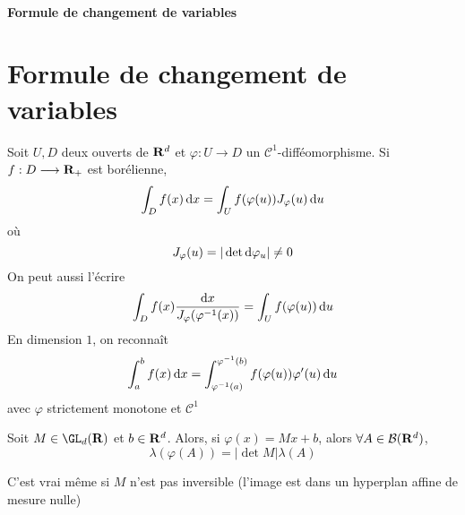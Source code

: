 \ifsolo
    ~

    \vspace{1cm}

    \begin{center}
        \textbf{\LARGE Formule de changement de variables} \\[1em]
    \end{center}
    \tableofcontents
\else
    \chapter{Formule de changement de variables}

    \minitoc
\fi
\thispagestyle{empty}

\begin{thm}
Soit $U, D$ deux ouverts de  $\mathbf R^d$ et $\varphi : U \longrightarrow D$ un $\mathcal  C^1$-difféomorphisme. Si $f : D \longrightarrow  \mathbf R_+$ est borélienne, \[
    \int_D f(x)\mathop{}\!\mathrm d x = \int_U f(\varphi(u))J_{\varphi}(u)\mathop{}\!\mathrm d u
\] 
où \[
    J_\varphi(u)=|\det \mathop{}\!\mathrm d \varphi_u|\neq 0
\] 
On peut aussi l'écrire \[
    \int_Df(x)\frac{\mathop{}\!\mathrm d x}{J_\varphi(\varphi^{-1}(x))}=\int_U f(\varphi(u))\mathop{}\!\mathrm d u
\] 
En dimension $1$, on reconnaît  \[
    \int_a^b f(x)\mathop{}\!\mathrm d x = \int_{\varphi^{-1}(a)}^{\varphi^{-1}(b)}f(\varphi(u))\varphi'(u)\mathop{}\!\mathrm d u
\] 
avec $\varphi$ strictement monotone et  $\mathcal  C^1$
\end{thm}

\begin{lmm}
    Soit $M \in  \GL_d(\R)$ et $b \in  \mathbf R^d$. Alors, si $\varphi(x)=Mx+b$, alors  $\forall  A \in  \mathcal  B(\mathbf R^d)$, \[
        \lambda(\varphi(A))= |\det M|\lambda(A)
    \] 
\end{lmm}

\begin{rem}
    C'est vrai même si $M$ n'est pas inversible (l'image est dans un hyperplan affine de mesure nulle)
\end{rem}

